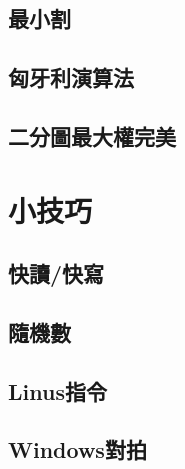 \documentclass[a4paper,10pt,twocolumn,oneside]{article}
\begin{document}
\subsection{最小割}

\subsection{匈牙利演算法}

\subsection{二分圖最大權完美}



% 
% 


\section{小技巧}
\subsection{快讀/快寫}

% 
\subsection{隨機數}

\subsection{Linus指令}

\subsection{Windows對拍}



% 
% 
\end{document}
